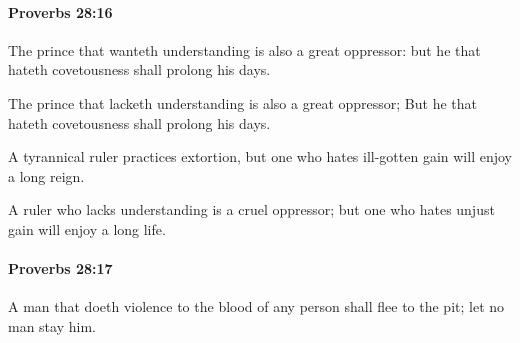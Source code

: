 		\paragraph{Proverbs 28:16} %
			\label{PROVERBS-28-16}

			The prince that wanteth understanding is also a great oppressor: but he that hateth covetousness shall prolong his days.

			\begin{versebox}
					\item[BHS] 
					\item[ASV] The prince that lacketh understanding is also a great oppressor; But he that hateth covetousness shall prolong his days.
					\item[NIV] A tyrannical ruler practices extortion, but one who hates ill-gotten gain will enjoy a long reign.
					\item[NRSV] A ruler who lacks understanding is a cruel oppressor; but one who hates unjust gain will enjoy a long life.
			\end{versebox}

		\paragraph{Proverbs 28:17} %
			\label{PROVERBS-28-17}

			A man that doeth violence to the blood of any person shall flee to the pit; let no man stay him.

